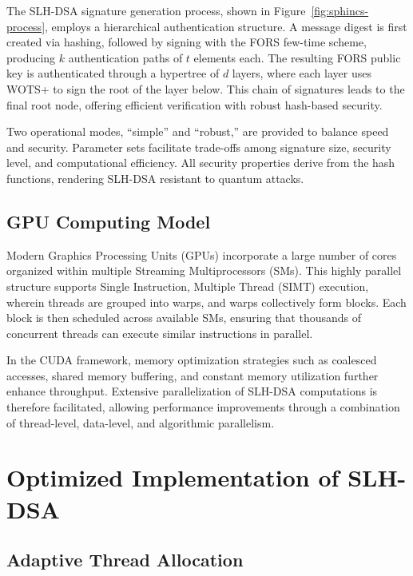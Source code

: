 \documentclass[journal]{IEEEtran}
\begin{document}
The SLH-DSA signature generation process, shown in Figure~\ref{fig:sphincs-process}, employs a hierarchical authentication structure. A message digest is first created via hashing, followed by signing with the FORS few-time scheme, producing $k$ authentication paths of $t$ elements each. The resulting FORS public key is authenticated through a hypertree of $d$ layers, where each layer uses WOTS+ to sign the root of the layer below. This chain of signatures leads to the final root node, offering efficient verification with robust hash-based security.

Two operational modes, “simple” and “robust,” are provided to balance speed and security. Parameter sets facilitate trade-offs among signature size, security level, and computational efficiency. All security properties derive from the hash functions, rendering SLH-DSA resistant to quantum attacks.

\subsection{GPU Computing Model}

Modern Graphics Processing Units (GPUs) incorporate a large number of cores organized within multiple Streaming Multiprocessors (SMs). This highly parallel structure supports Single Instruction, Multiple Thread (SIMT) execution, wherein threads are grouped into warps, and warps collectively form blocks. Each block is then scheduled across available SMs, ensuring that thousands of concurrent threads can execute similar instructions in parallel.

In the CUDA framework, memory optimization strategies such as coalesced accesses, shared memory buffering, and constant memory utilization further enhance throughput. Extensive parallelization of SLH-DSA computations is therefore facilitated, allowing performance improvements through a combination of thread-level, data-level, and algorithmic parallelism.

\section{Optimized Implementation of SLH-DSA}\label{sec:implementation}


\subsection{Adaptive Thread Allocation}
\end{document}

